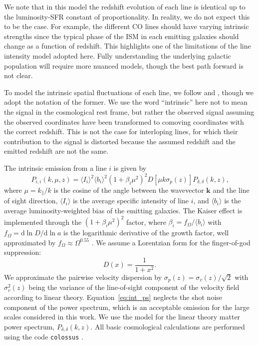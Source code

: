 \documentclass{aastex62}
\newcommand{\beq}{\begin{equation}}
\newcommand{\eeq}{\end{equation}}
\newcommand{\avg}[1]{\ensuremath{\langle #1 \rangle}}
\begin{document}
We note that in this model the redshift evolution of each line is identical up
to the luminosity-SFR constant of proportionality. In reality, we do not
expect this to be the case. For example, the different CO lines should have
varying intrinsic strengths since the typical phase of the ISM in each
emitting galaxies should change as a function of redshift. This highlights one
of the limitations of the line intensity model adopted here. Fully
understanding the underlying galactic population will require more nuanced
models, though the best path forward is not clear.

To model the intrinsic spatial fluctuations of each line, we follow
\citet{2016ApJ...825..143L} and \citet{2016ApJ...832..165C}, though we adopt
the notation of the former. We use the word ``intrinsic'' here not to mean the
signal in the cosmological rest frame, but rather the observed signal assuming
the observed coordinates have been transformed to comoving coordinates with
the correct redshift. This is not the case for interloping lines, for which
their contribution to the signal is distorted because the assumed redshift and
the emitted redshift are not the same. 

The intrinsic emission from a line $i$ is given by
\beq\label{eq:int_ps}
P_{i,i}(k, \mu, z) = \avg{I_i}^2 \avg{b_i}^2 (1 + \beta_i \mu^2)^2 
              D\left[\mu k \sigma_p(z)\right] P_{\delta, \delta}(k, z)\text{,}
\eeq
where $\mu=k_{\parallel}/k$ is the cosine of the angle between the wavevector
$\bm{k}$ and the line of sight direction, $\avg{I_i}$ is the average specific
intensity of line $i$, and $\avg{b_i}$ is the average luminosity-weighted bias
of the emitting galaxies. The Kaiser effect \citep{1987MNRAS.227....1K} is implemented
through the $(1 + \beta_i \mu^2)^2$ factor, where $\beta_i =
f_{\Omega}/\avg{b_i}$ with $f_{\Omega} = \text{d}\ln{D}/\text{d}\ln{a}$ is the
logarithmic derivative of the growth factor, well approximated by $f_{\Omega}
\approx \Omega^{0.55}$ \citep{2005PhRvD..72d3529L}. We assume a Lorentzian form for the
finger-of-god suppression:
\beq\label{eq:fog}
D(x) = \frac{1}{1+x^2}\text{.}
\eeq
We approximate the pairwise velocity dispersion by $\sigma_p(z) =
\sigma_v(z)/\sqrt{2}$ with $\sigma_v^2(z)$ being the variance of the
line-of-sight component of the velocity field according to linear theory.
Equation~\eqref{eq:int_ps} neglects the shot noise component of the power
spectrum, which is an acceptable omission for the large scales considered in
this work. We use the \citet{1998ApJ...496..605E} model for the linear theory
matter power spectrum, $P_{\delta,\delta}(k, z)$. All basic cosmological
calculations are performed using the code \texttt{colossus} \citep{2018ApJS..239...35D}.
\end{document}
